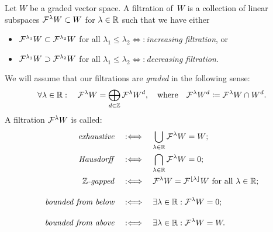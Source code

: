\documentclass[\MainFolder/Text.tex]{subfiles}
\begin{document}
\begin{Definition}[Filtrations] \label{Def:Filtrations}
Let $W$ be a graded vector space. A filtration of~$W$ is a collection of linear subspaces $\mathcal{F}^\lambda W \subset W$ for $\lambda\in \mathbb{R}$ such that we have either
\begin{itemize}
\item $\mathcal{F}^{\lambda_1}W\subset \mathcal{F}^{\lambda_2}W$ for all $\lambda_1 \le \lambda_2$\quad$\Longleftrightarrow:$\quad\emph{increasing filtration}, or
\item  $\mathcal{F}^{\lambda_1}W\supset \mathcal{F}^{\lambda_2}W$ for all $\lambda_1 \le \lambda_2$\quad$\Longleftrightarrow:$\quad\emph{decreasing filtration.}
\end{itemize}
We will assume that our filtrations are \emph{graded} in the following sense:
$$ \forall \lambda\in \mathbb{R}:\quad \mathcal{F}^\lambda W = \bigoplus_{d\in \mathbb{Z}} \mathcal{F}^\lambda W^d,\quad \text{where}\quad\mathcal{F}^\lambda W^d \coloneqq \mathcal{F}^\lambda W \cap W^d.$$
A filtration $\mathcal{F}^\lambda W$ is called:
\begin{align*}
 \text{\emph{exhaustive}}&\quad:\Longleftrightarrow\quad\bigcup_{\lambda\in \mathbb{R}} \mathcal{F}^\lambda W = W;\\
 \text{\emph{Hausdorff}} &\quad:\Longleftrightarrow\quad\bigcap_{\lambda\in \mathbb{R}} \mathcal{F}^\lambda W = 0;\\
 \text{\emph{$\mathbb{Z}$-gapped}} &\quad:\Longleftrightarrow\quad\mathcal{F}^\lambda W = \mathcal{F}^{\lfloor\lambda\rfloor} W\text{ for all }\lambda \in \mathbb{R};\\[3\jot]
 \text{\emph{bounded from below}}&\quad:\Longleftrightarrow\quad\exists \lambda \in \mathbb{R}: \mathcal{F}^\lambda W =0;\\[3\jot]
 \text{\emph{bounded from above}}&\quad:\Longleftrightarrow\quad\exists \lambda\in \mathbb{R}: \mathcal{F}^\lambda W =W.
\end{align*} 


\end{Definition}
\end{document}
